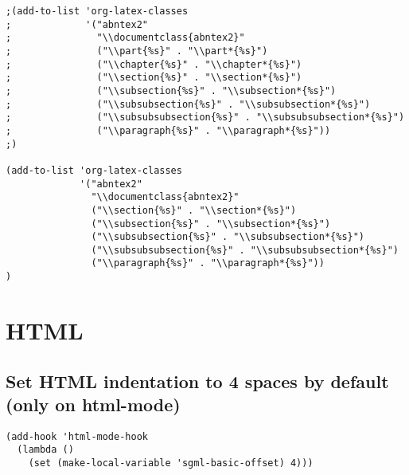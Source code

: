 \documentclass[11pt]{article}
\begin{document}
\begin{verbatim}
;(add-to-list 'org-latex-classes
;             '("abntex2"
;               "\\documentclass{abntex2}"
;               ("\\part{%s}" . "\\part*{%s}")
;               ("\\chapter{%s}" . "\\chapter*{%s}")
;               ("\\section{%s}" . "\\section*{%s}")
;               ("\\subsection{%s}" . "\\subsection*{%s}")
;               ("\\subsubsection{%s}" . "\\subsubsection*{%s}")
;               ("\\subsubsubsection{%s}" . "\\subsubsubsection*{%s}")
;               ("\\paragraph{%s}" . "\\paragraph*{%s}"))
;)

(add-to-list 'org-latex-classes
             '("abntex2"
               "\\documentclass{abntex2}"
               ("\\section{%s}" . "\\section*{%s}")
               ("\\subsection{%s}" . "\\subsection*{%s}")
               ("\\subsubsection{%s}" . "\\subsubsection*{%s}")
               ("\\subsubsubsection{%s}" . "\\subsubsubsection*{%s}")
               ("\\paragraph{%s}" . "\\paragraph*{%s}"))
)
\end{verbatim}

\section*{HTML}
\label{sec:orge3ab266}

\subsection*{Set HTML indentation to 4 spaces by default (only on html-mode)}
\label{sec:orge2773a1}
\begin{verbatim}
(add-hook 'html-mode-hook
  (lambda ()
    (set (make-local-variable 'sgml-basic-offset) 4)))
\end{verbatim}
\end{document}
